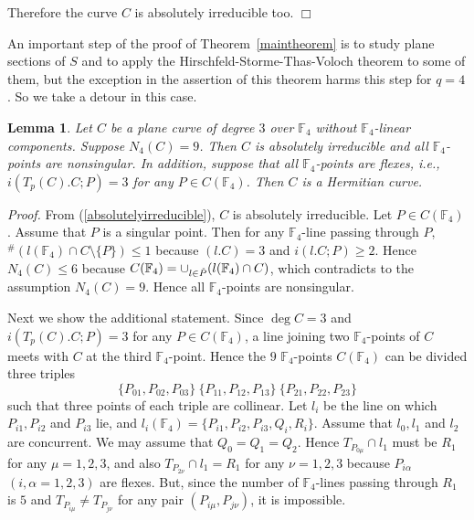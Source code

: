 \documentclass[a4paper,11pt]{article}
\newtheorem{lemma}[theorem]{Lemma}
\newcommand{\proof}{\noindent \mbox{\em Proof.\hspace*{2mm}}}
\newcommand{\qed}{\hfill \mbox{$  \Box $}}
\newcommand{\ssgyokan}{\vskip 4pt}
\begin{document}
Therefore the curve $C$ is absolutely irreducible too.
\qed

\ssgyokan

An important step of the proof of Theorem~\ref{maintheorem} is
to study plane sections of $S$
and to apply the Hirschfeld-Storme-Thas-Voloch theorem to some of them,
but the exception in the assertion of this theorem harms this step for
$q=4$.
So we take a detour in this case.

\begin{lemma}\label{detour}
Let $C$ be a plane curve of degree $3$ over $\mathbb{F}_4$
without $\mathbb{F}_4$-linear components.
Suppose $N_4(C)=9$.
Then $C$ is absolutely irreducible
and all $\mathbb{F}_4$-points are nonsingular.
In addition, suppose that all $\mathbb{F}_4$-points are flexes,
i.e., $i(T_p(C).C;P) =3$ for any $P \in C(\mathbb{F}_4)$.
Then $C$ is a Hermitian curve.
\end{lemma}
\proof
From (\ref{absolutelyirreducible}),
$C$ is absolutely irreducible.
Let $P \in C(\mathbb{F}_4)$.
Assume that $P$ is a singular point.
Then for any $\mathbb{F}_4$-line passing through $P$,
${}^{\#}(l(\mathbb{F}_4)\cap C \setminus \{P\}) \leq 1$
because $(l.C)=3$ and $i(l.C; P) \geq 2$.
Hence $N_4(C) \leq 6$ because
$C(\mathbb{F}_4) = \cup_{l \in \Check{P}} (l(\mathbb{F}_4)\cap C)$,
which contradicts to the assumption $N_4(C)=9$.
Hence all $\mathbb{F}_4$-points are nonsingular.

Next we show the additional statement.
Since $\deg C=3$ and $i(T_p(C).C;P) =3$ for any $P \in C(\mathbb{F}_4)$,
a line joining two $\mathbb{F}_4$-points of $C$ meets with $C$
at the third $\mathbb{F}_4$-point.
Hence the $9$ $\mathbb{F}_4$-points $C(\mathbb{F}_4)$
can be divided three triples
\[
\{P_{01}, P_{02}, P_{03}\} \ \{P_{11}, P_{12}, P_{13}\} \ 
\{P_{21}, P_{22}, P_{23}\}
\]
such that three points of each triple are collinear.
Let $l_i$ be the line on which $P_{i1}, P_{i2}$ and  $P_{i3}$ lie, and
$l_i(\mathbb{F}_4) = \{P_{i1}, P_{i2}, P_{i3}, Q_i, R_i \}$.
Assume that $l_0, l_1$ and $l_2$ are concurrent.
We may assume that $Q_0=Q_1=Q_2$.
Hence $T_{P_{0 \mu}} \cap l_1$ must be $R_1$ for any $\mu =1,2,3$, and also
$T_{P_{2 \nu}} \cap l_1 = R_1$ for any $\nu =1,2,3$
because $P_{i \alpha}$ $(i, \alpha =1,2,3)$ are flexes.
But, since the number of $\mathbb{F}_4$-lines passing through $R_1$ is $5$
and $T_{P_{i \mu}} \neq T_{P_{j \nu}} $ for any pair $(P_{i \mu}, P_{j \nu})$,
it is impossible.
\end{document}
